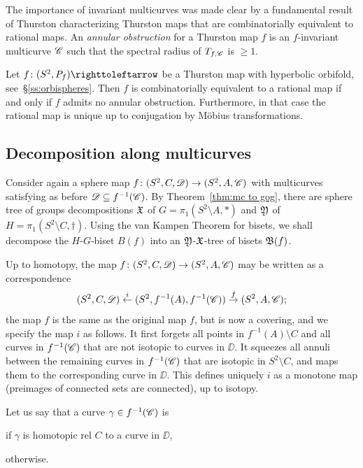 \documentclass{amsart}
\begin{document}
The importance of invariant multicurves was made clear by a
fundamental result of Thurston characterizing Thurston maps that are
combinatorially equivalent to rational maps. An \emph{annular
  obstruction} for a Thurston map $f$ is an $f$-invariant multicurve
${\mathscr C}$ such that the spectral radius of $T_{f,{\mathscr C}}$ is $\ge1$.
\begin{thm}\label{thm:thurston}
  Let $f\colon(S^2,P_f)\selfmap$ be a Thurston map with hyperbolic
  orbifold, see~\S\ref{ss:orbispheres}. Then $f$ is combinatorially
  equivalent to a rational map if and only if $f$ admits no annular
  obstruction.  Furthermore, in that case the rational map is unique
  up to conjugation by M\"obius transformations.
\end{thm}

\subsection{Decomposition along multicurves}
Consider again a sphere map $f\colon(S^2,C,{\mathscr D})\to(S^2,A,{\mathscr C})$ with
multicurves satisfying as before ${\mathscr D}\subseteq f^{-1}({\mathscr C})$. By
Theorem~\ref{thm:mc to gog}, there are sphere tree of groups decompositions
${\mathfrak X}$ of $G=\pi_1(S^2\setminus A,*)$ and ${\mathfrak Y}$ of
$H=\pi_1(S^2\setminus C,\dagger)$.  Using the van Kampen Theorem for
bisets, we shall decompose the $H$-$G$-biset $B(f)$ into an
${\mathfrak Y}$-${\mathfrak X}$-tree of bisets ${\mathfrak B}(f)$.

Up to homotopy, the map $f\colon(S^2,C,{\mathscr D})\to(S^2,A,{\mathscr C})$ may be
written as a correspondence
\begin{equation}
\label{eq:corr:f_i}(S^2,C,{\mathscr D})\overset i\leftarrow(S^2,f^{-1}(A),f^{-1}({\mathscr C}))\overset
f\to(S^2,A,{\mathscr C});
\end{equation}
the map $f$ is the same as the original map $f$, but is now a
covering, and we specify the map $i$ as follows. It first forgets all
points in $f^{-1}(A)\setminus C$ and all curves in $f^{-1}({\mathscr C})$ that
are not isotopic to curves in $\DD$. It squeezes all annuli between
the remaining curves in $f^{-1}({\mathscr C})$ that are isotopic in
$S^2\setminus C$, and maps them to the corresponding curve in
$\DD$. This defines uniquely $i$ as a monotone map (preimages of
connected sets are connected), up to isotopy.

\noindent Let us say that a curve $\gamma\in f^{-1}({\mathscr C})$ is
\begin{idescription}
\item[essential] if $\gamma$ is homotopic rel $C$ to a curve in $\DD$,
\item[non-essential] otherwise.   
\end{idescription}
\end{document}

